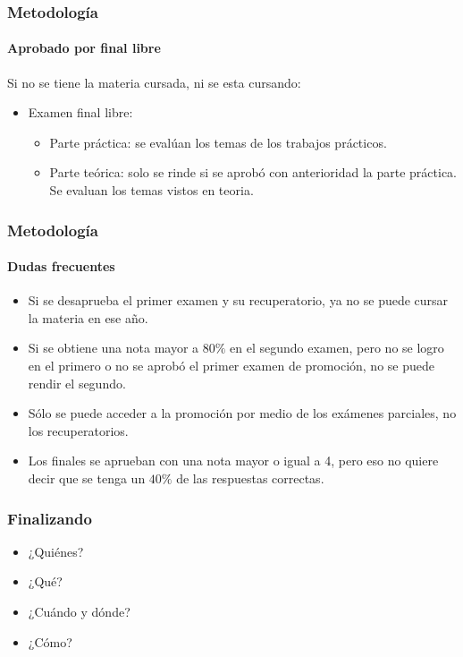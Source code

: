 \documentclass[11pt,a4paper,spanish]{beamer}
\begin{document}
\begin{frame}

    \frametitle{Metodología}
    \framesubtitle{Aprobado por final libre}

Si no se tiene la materia cursada, ni se esta cursando:
\begin{itemize}
    \item Examen final libre:
        \begin{itemize}
            \item Parte práctica: se evalúan los temas de los trabajos
                prácticos.
            \item Parte teórica: solo se rinde si se aprobó con anterioridad
                la parte práctica. Se evaluan los temas vistos en teoria.
        \end{itemize}
\end{itemize}


\end{frame}

\begin{frame}

    \frametitle{Metodología}
    \framesubtitle{Dudas frecuentes}

\begin{itemize}

    \item Si se desaprueba el primer examen y su recuperatorio, ya no se puede
        cursar la materia en ese año.
    \item Si se obtiene una nota mayor a $80\%$ en el segundo examen, pero no
        se logro en el primero o no se aprobó el primer examen de promoción,
        no se puede rendir el segundo.
    \item Sólo se puede acceder a la promoción por medio de los exámenes
        parciales, no los recuperatorios.
    \item Los finales se aprueban con una nota mayor o igual a 4, pero eso no
        quiere decir que se tenga un $40\%$ de las respuestas correctas.

\end{itemize}

\end{frame}

\begin{frame}

    \frametitle{Finalizando}

\begin{itemize}

\item ¿Quiénes?

\item ¿Qué?

\item ¿Cuándo y dónde?

\item ¿Cómo?

\end{itemize}

\end{frame}
\end{document}

